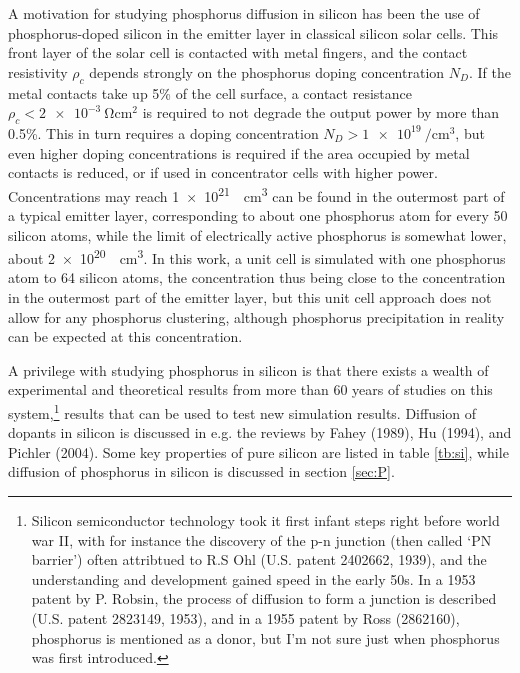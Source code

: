 \documentclass[11pt,bibliography=totoc,index=totoc]{scrbook}   %
\begin{document}
A motivation for studying phosphorus diffusion in silicon has been the use of phosphorus-doped silicon in the emitter layer in classical silicon solar cells.
This front layer of the solar cell is contacted with metal fingers, and 
the contact resistivity $\rho_c$ depends strongly on the phosphorus doping concentration $N_D$.
If the metal contacts take up 5\% of the cell surface, a contact resistance $\rho_c < \SI{2e-3}{\ohm\centi\metre\squared}$ is required to not degrade the output power by more than 0.5\%. 
This in turn requires a doping concentration $N_D > \SI{1e19}{\per\centi\metre\cubed}$, but even higher doping concentrations is required if the area occupied by metal contacts is reduced, or if used in concentrator cells with higher power.\cite{Schroder:1984}
Concentrations may reach \SI{1e21}{\per\centi\metre\cubed} can be found in the outermost part of a typical emitter layer,\cite[40]{Bentzen:2006}
corresponding to about one phosphorus atom for every 50 silicon atoms,
while the limit of electrically active phosphorus is somewhat lower, about \SI{2e20}{\per\centi\metre\cubed}.\cite[40]{Bentzen:2006}
In this work, a unit cell is simulated with one phosphorus atom to 64 silicon atoms,
the concentration thus being close to the concentration in the outermost part of the emitter layer, 
but this unit cell approach does not allow for any phosphorus clustering, 
although phosphorus precipitation in reality can be expected at this concentration.


A privilege with studying phosphorus in silicon is that there exists a wealth of experimental and theoretical results from more 
than 60 years of studies on this system,\footnote{
  Silicon semiconductor technology took it first infant steps right before world war II, with for instance
  the discovery of the p-n junction (then called `PN barrier') often attribtued to R.S Ohl (U.S. patent 2402662, 1939),
  and the understanding and development gained speed in the early 50s. In a 1953 patent by P. Robsin, the process of 
  diffusion to form a junction is described (U.S. patent 2823149, 1953), and in a 1955 patent by Ross (2862160), 
  phosphorus is mentioned as a donor, but I'm not sure just when phosphorus was first introduced.
} results that can be used to test new simulation results.
Diffusion of dopants in silicon is discussed in e.g. the reviews by Fahey (1989)\cite{Fahey:1989}, Hu (1994)\cite{Hu:1994}, and Pichler (2004)\cite{Pichler:2004}.
Some key properties of pure silicon are listed in table \ref{tb:si}, while diffusion of phosphorus in silicon is discussed in section \ref{sec:P}.
\end{document}
